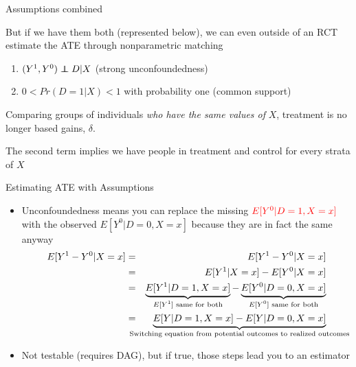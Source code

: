 \documentclass{beamer}
\newcommand\independent{\protect\mathpalette{\protect\independenT}{\perp}}
\def\independenT#1#2{\mathrel{\rlap{$#1#2$}\mkern2mu{#1#2}}}
\begin{document}
\begin{frame}{Assumptions combined}
	
But if we have them both (represented below), we can even outside of an RCT estimate the ATE through nonparametric matching
  \begin{enumerate}
		\item $(Y^1,Y^0) \independent{D} | X$ (strong unconfoundedness)
		\item $0<Pr(D=1|X)<1$ with probability one (common support)
  \end{enumerate}

\bigskip
Comparing groups of individuals \emph{who have the same values of} $X$, treatment is no longer based gains, $\delta$. 

\bigskip

The second term implies we have people in treatment and control for every strata of $X$
\end{frame}


\begin{frame}{Estimating ATE with Assumptions}


	\begin{itemize}
	\item Unconfoundedness means you can replace the missing $\textcolor{red}{E[Y^0|D=1,X=x]}$ with the observed $E[Y^0|D=0, X=x]$ because they are in fact the same anyway
		\begin{eqnarray*}
		E[Y^1-Y^0|X=x] &=& E[Y^1 - Y^0 | X=x] \\
		&=& E[Y^1|X=x] - E[Y^0 | X=x] \\
		&=& \underbrace{E[Y^1|D=1,X=x]}_{\mathclap{\text{$E[Y^1]$ same for both}}} - \underbrace{E[Y^0 | D=0,X=x]}_{\mathclap{\text{$E[Y^0]$ same for both}}} \\
		&=&\underbrace{E[Y|D=1,X=x] - E[Y|D=0, X=x]}_{\mathclap{\text{Switching equation from potential outcomes to realized outcomes}}}
		\end{eqnarray*}
	\item Not testable (requires DAG), but if true, those steps lead you to an estimator
	\end{itemize}

\end{frame}
\end{document}
